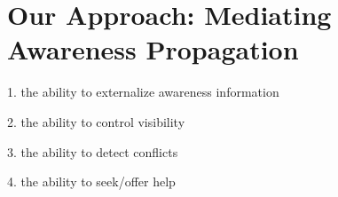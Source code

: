 \graphicspath{{Figures/}}

\chapter{Our Approach: Mediating Awareness Propagation} %
\label{cha:mediate_awareness_propagation}

1. the ability to externalize awareness information

2. the ability to control visibility

3. the ability to detect conflicts

4. the ability to seek/offer help




 

